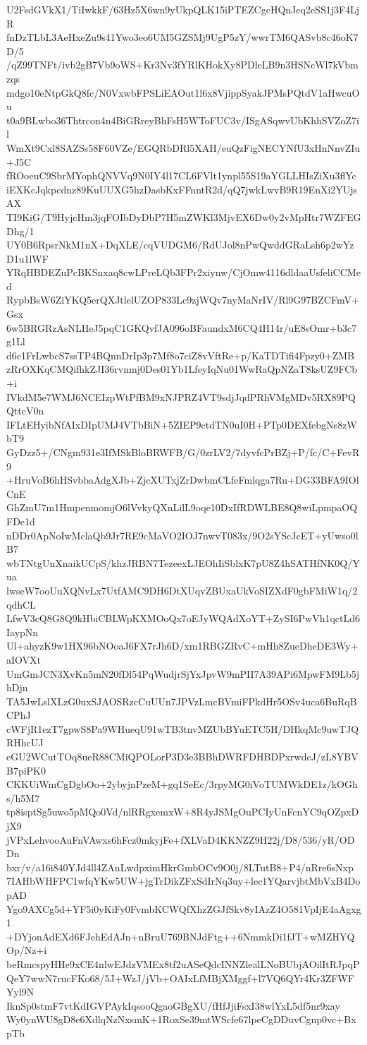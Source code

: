 U2FsdGVkX1/TiIwkkF/63Hz5X6wn9yUkpQLK15iPTEZCgcHQnJeq2eSS1j3F4LjR
fnDzTLbL3AeHxeZu9s41Ywo3eo6UM5GZSMj9UgP5zY/wwrTM6QASvb8c46oK7D/5
/qZ99TNFt/ivb2gB7Vb9oWS+Kr3Nv3fYRlKHokXy8PDleLB9n3HSNcWl7kVbmzqs
mdgo10eNtpGkQ8fc/N0VxwbFPSLiEAOut1l6x8VjippSyakJPMsPQtdV1aHwcuOu
t0a9BLwbo36Thtrcon4n4BiGRreyBhFsH5WToFUC3v/ISgASqwvUbKhhSVZoZ7il
WmXt9Cxl8SAZSs58F60VZe/EGQRbDRl5XAH/euQzFigNECYNfU3xHnNnvZIu+J5C
fROoeuC9SbrMYophQNVVq9N0IY4l17CL6FVlt1ynpl55S19aYGLLHIsZiXu3flYc
iEXKcJqkpcdnz89KuUUXG5hzDasbKxFFnntR2d/qQ7jwkLwvB9R19EnXi2YUjsAX
TI9KiG/T9HyjcHm3jqFOIbDyDbP7H5mZWKl3MjvEX6Dw0y2vMpHtr7WZFEGDhg/1
UY0B6RpsrNkM1nX+DqXLE/cqVUDGM6/RdUJol8nPwQwddGRaLsh6p2wYzD1u1lWF
YRqHBDEZuPcBKSnxaq8cwLPreLQb3FPr2xiynw/CjOmw4116dldaaUsfeliCCMed
RypbBsW6ZiYKQ5erQXJtlelUZOP833Lc9zjWQv7nyMaNrIV/Rl9G97BZCFmV+Gsx
6w5BRGRzAsNLHeJ5pqC1GKQvfJA096oBFaundxM6CQ4H14r/uE8sOmr+b3c7g1Ll
d6c1FrLwbcS7ssTP4BQnnDrIp3p7Mf8o7ciZ8vVftRe+p/KaTDTifi4Fpzy0+ZMB
zRrOXKqCMQifhkZJI36rvnmj0Des01Yb1LfeyIqNu01WwRaQpNZaT8ksUZ9FCb+i
IVkdM5e7WMJ6NCEIzpWtPfBM9xNJPRZ4VT9sdjJqdPRhVMgMDv5RX89PQQttcV0n
IFLtEHyibNfAIxDIpUMJ4VTbBiN+5ZIEP9ctdTN0uI0H+PTp0DEXfebgNs8zWbT9
GyDzz5+/CNgm931e3IfMSkBloBRWFB/G/0zrLV2/7dyvfcPrBZj+P/fc/C+FevR9
+HruVoB6hHSvbbaAdgXJb+ZjcXUTxjZrDwbmCLfeFmlqga7Ru+DG33BFA9IOlCnE
GhZmU7m1HmpenmomjO6lVvkyQXnLilL9oqe10DxIfRDWLBE8Q8wiLpmpaOQFDe1d
nDDr0ApNoIwMclaQb9Jr7RE9cMaVO2IOJ7nwvT083x/9O2sYScJcET+yUwso0lB7
wbTNtgUnXnaikUCpS/khzJRBN7TezeexLJEOhIiSblxK7pU8Z4hSATHfNK0Q/Yua
lwseW7ooUuXQNvLx7UtfAMC9DH6DtXUqvZBUxaUkVoSIZXdF0gbFMiW1q/2qdhCL
LfwV3cQ8G8Q9kHbiCBLWpKXMOoQx7oEJyWQAdXoYT+ZySI6PwVh1qctLd6IaypNn
Ul+ahyzK9w1HX96bNOoaJ6FX7rJh6D/xm1RBGZRvC+mHh8ZueDheDE3Wy+aIOVXt
UmGmJCN3XvKn5mN20fDl54PqWudjrSjYxJpvW9mPII7A39APi6MpwFM9Lb5jhDjn
TA5JwLslXLzG0uxSJAOSRzcCuUUn7JPVzLmcBVmiFPkdHr5OSv4uca6BuRqBCPhJ
cWFjR1ezT7gpwS8Pa9WHueqU91wTB3tnvMZUbBYuETC5H/DHkqMc9uwTJQRHhcUJ
eGU2WCutTOq8ueR88CMiQPOLorP3D3e3BBhDWRFDHBDPxrwdcJ/zL8YBVB7piPK0
CKKUiWmCgDgbOo+2ybyjnPzeM+gq1SeEc/3rpyMG0iVoTUMWkDE1z/kOGhs/h5M7
tp8isptSg5uwo5pMQo0Vd/nlRRgxemxW+8R4yJSMgOuPCIyUnFcnYC9qOZpxDjX9
jVPxLehvooAuFnVAwxs6hFcz0mkyjFe+fXLVaD4KKNZZ9H22j/D8/536/yR/ODDn
bxr/v/a16i840YJd4ll4ZAnLwdpximHkrGmbOCv9O0j/8LTutB8+P4/nRre6sNxp
7IAHbWHFPC1wfqYKw5UW+jgTrDikZFxSdIrNq3uy+lec1YQarvjbtMbVxB4DopAD
Ygo9AXCg5d+YF5i0yKiFy0FvmbKCWQfXhzZGJfSkv8yIAzZ4O581VpIjE4aAgxg1
+DYjonAdEXd6FJehEdAJn+nBruU769BNJdFtg++6NmmkDi1fJT+wMZHYQOp/Nz+i
beRmcspyHHe9xCE4nlwEJdzVMEx8tf2uASeQdcINNZlealLNoBUbjAOilItRJpqP
QeY7wwN7rucFKo68/5J+WzJ/jVb+OAIxLfMBjXMggf+l7VQ6QYr4Kr3ZFWFYyl9N
IknSp0stmF7vtKdIGVPAykIqsooQgaoGBgXU/fHfJjiFsxI38wlYxL5df5nr9xay
Wy0ynWU8gD8e6XdlqNzNxsmK+1RoxSe39mtWScfe67lpeCgDDuvCgnp0vc+BxpTb
